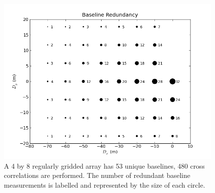 \documentclass[useAMS,macros,usenatbib]{mn2e}
\begin{document}
\begin{figure}
    \centering
    \includegraphics[width=\linewidth]{graphics/redbl.png}
    \caption{A 4 by 8 regularly gridded array has 53 unique baselines, 480 cross correlations are performed. The number of redundant baseline measurements is labelled and represented by the size of each circle.}
    \label{fig:redbl}
\end{figure}
\end{document}
